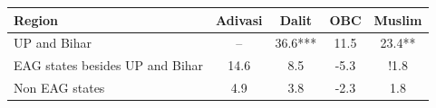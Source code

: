 \begin{tabular}{lcccc}
\hline
Region & Adivasi & Dalit & OBC & Muslim \\
\hline
UP and Bihar&--&36.6***&11.5&23.4**\\
EAG states besides UP and Bihar&14.6&8.5&-5.3&!1.8\\
Non EAG states&4.9&3.8&-2.3&1.8\\
\hline
\end{tabular}
